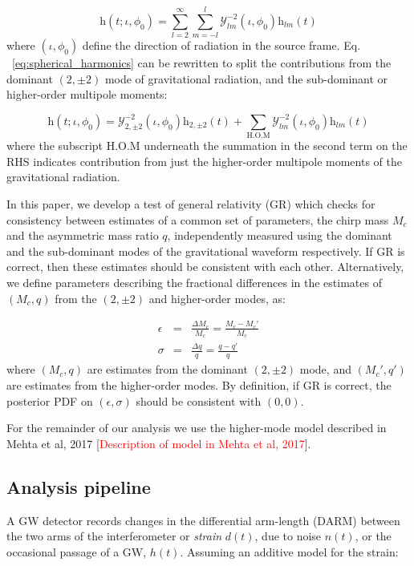 \documentclass[prd,preprintnumbers,twocolumn,eqsecnum,floatfix,a4paper,nofootinbib,superscriptaddress]{revtex4}
\begin{document}
\begin{equation}
\mathrm{h}(t; \iota, \phi_0) = \sum _{l=2}^{\infty} \sum _{m=-l}^{l} \mathcal{Y}_{lm}^{-2} (\iota, \phi_0)\mathrm{h}_{lm}(t)
\label{eq:spherical_harmonics}
\end{equation}
where $(\iota, \phi_0)$ define the direction of radiation in the source frame. Eq. ~\ref{eq:spherical_harmonics} can be rewritten to split the contributions from the dominant $(2,\pm 2)$ mode of gravitational radiation, and the sub-dominant or higher-order multipole moments:

\begin{equation}
\mathrm{h}(t; \iota, \phi_0) = \mathcal{Y}_{2,\pm 2}^{-2} (\iota, \phi_0)\mathrm{h}_{2,\pm 2}(t) + \sum _{\text{H.O.M}} \mathcal{Y}_{lm}^{-2} (\iota, \phi_0)\mathrm{h}_{lm}(t)
\label{eq:test_HM}
\end{equation}
where the subscript H.O.M underneath the summation in the second term on the RHS indicates contribution from just the higher-order multipole moments of the gravitational radiation.

In this paper, we develop a test of general relativity (GR) which checks for consistency between estimates of a common set of parameters, the chirp mass $M_c$ and the asymmetric mass ratio $q$, independently measured using the dominant and the sub-dominant modes of the gravitational waveform respectively. If GR is correct, then these estimates should be consistent with each other. Alternatively, we define parameters describing the fractional differences in the estimates of $(M_c,q)$ from the $(2,\pm 2)$ and higher-order modes, as:

\begin{eqnarray}
\epsilon &=& \frac{\Delta M _c}{M _c} = \frac{M_c - M_c '}{M _c} \\
\sigma &=& \frac{\Delta q}{q} = \frac{q - q '}{q}
\end{eqnarray}
where $(M_c, q)$ are estimates from the dominant $(2,\pm 2)$ mode, and $(M_c', q')$ are estimates from the higher-order modes. By definition, if GR is correct, the posterior PDF on $(\epsilon, \sigma)$ should be consistent with $(0,0)$.

For the remainder of our analysis we use the higher-mode model described in Mehta et al, 2017 [\textcolor{red}{Description of model in Mehta et al, 2017}].


\subsection{Analysis pipeline}
A GW detector records changes in the differential arm-length (DARM) between the two arms of the interferometer or \emph{strain} $d(t)$, due to noise $n(t)$, or the occasional passage of a GW, $h(t)$. Assuming an additive model for the strain:
\end{document}
